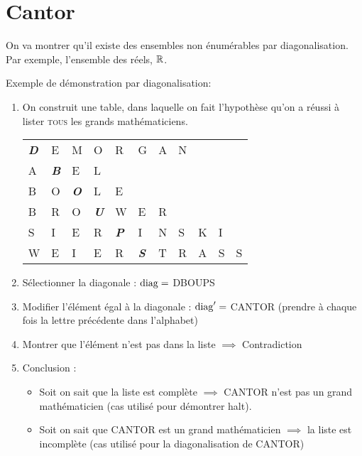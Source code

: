
\section{Cantor}
\label{sec:cantor}
On va montrer qu'il existe des ensembles non énumérables par diagonalisation. Par exemple, l'ensemble des réels, $\mathbb{R}$.
\begin{myexem}
	Exemple de démonstration par diagonalisation:
	\begin{enumerate}
		\item On construit une table, dans laquelle on fait l'hypothèse qu'on a réussi à lister \textsc{tous} les grands mathématiciens.\\
			\begin{tabular}{lllllllllll}
				\emph{\textbf{D}}&E& M&O&R&G&A&N&&& \\
				A&\emph{\textbf{B}}&E&L&&&&&&&\\
				B&O&\emph{\textbf{O}}&L&E&&&&&&\\
				B&R&O&\emph{\textbf{U}}&W&E&R&&&&\\
				S&I&E&R&\emph{\textbf{P}}&I&N&S&K&I&\\
				W&E&I&E&R&\emph{\textbf{S}}&T&R&A&S&S\\
			\end{tabular}
		\item Sélectionner la diagonale : $\operatorname{diag} = $ DBOUPS
		\item Modifier l'élément égal à la diagonale : $\operatorname{diag}' =$ CANTOR (prendre à chaque fois la lettre précédente dans l'alphabet)
		\item Montrer que l'élément n'est pas dans la liste $\implies$ Contradiction
		\item Conclusion :
			\begin{itemize}
				\item Soit on sait que la liste est complète
					\subitem $ \implies$ CANTOR n'est pas un grand
					mathématicien (cas utilisé pour démontrer halt).
				\item Soit on sait que CANTOR est un grand
					mathématicien
					\subitem $ \implies$ la liste est incomplète (cas utilisé pour la diagonalisation de CANTOR)
			\end{itemize}
	\end{enumerate}
\end{myexem}

